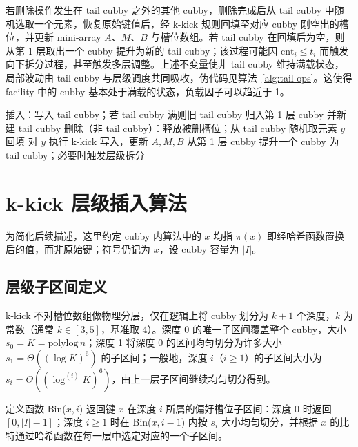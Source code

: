 若删除操作发生在 tail cubby 之外的其他 cubby，删除完成后从 tail cubby 中随机选取一个元素，恢复原始键值后，经 k-kick 规则回填至对应 cubby 刚空出的槽位，并更新 mini-array \(A\)、\(M\)、\(B\) 与槽位数组。若 tail cubby 在回填后为空，则从第 1 层取出一个 cubby 提升为新的 tail cubby；该过程可能因 \(\mathrm{cnt}_i\le t_i\) 而触发向下拆分过程，甚至触发多层调整。上述不变量使非 tail cubby 维持满载状态，局部波动由 tail cubby 与层级调度共同吸收，伪代码见算法~\ref{alg:tail-ops}\cite{bender2022otsh,aamand2021dynamic,bansal2022deletions}。这使得 facility 中的 cubby 基本处于满载的状态，负载因子可以趋近于 1。

\begin{algorithm}[htbp]
  \caption{tail cubby 维护与删除回填}
  \label{alg:tail-ops}
  \begin{algorithmic}[1]
    \State 插入：写入 tail cubby；若 tail cubby 满则旧 tail cubby 归入第 1 层 cubby 并新建 tail cubby
    \State 删除（非 tail cubby）：释放被删槽位；从 tail cubby 随机取元素 \(y\) 回填
    \State 对 \(y\) 执行 k-kick 写入，更新 \(A,M,B\)
      \State 从第 1 层 cubby 提升一个 cubby 为 tail cubby；必要时触发层级拆分
    \EndIf
  \end{algorithmic}
\end{algorithm}

\section{k-kick 层级插入算法}

为简化后续描述，这里约定 cubby 内算法中的 \(x\) 均指 \(\pi(x)\) 即经哈希函数置换后的值，而非原始键；符号仍记为 \(x\)，设 cubby 容量为 \(|I|\)。

\subsection{层级子区间定义}

k-kick 不对槽位数组做物理分层，仅在逻辑上将 cubby 划分为 \(k+1\) 个深度，\(k\) 为常数（通常 \(k\in[3,5]\)，基准取 4）。深度 0 的唯一子区间覆盖整个 cubby，大小 \(s_0=K=\mathrm{polylog}\,n\)；深度 1 将深度 0 的区间均匀切分为许多大小 \(s_1=\Theta((\log K)^6)\) 的子区间；一般地，深度 \(i\)（\(i\ge 1\)）的子区间大小为 \(s_i=\Theta((\log^{(i)}K)^6)\)，由上一层子区间继续均匀切分得到。

定义函数 Bin(\(x,i\)) 返回键 \(x\) 在深度 \(i\) 所属的偏好槽位子区间：深度 0 时返回 \([0,|I|-1]\)；深度 \(i\ge 1\) 时在 Bin(\(x,i-1\)) 内按 \(s_i\) 大小均匀切分，并根据 \(x\) 的比特通过哈希函数在每一层中选定对应的一个子区间\cite{bender2022otsh,carter1979}。

